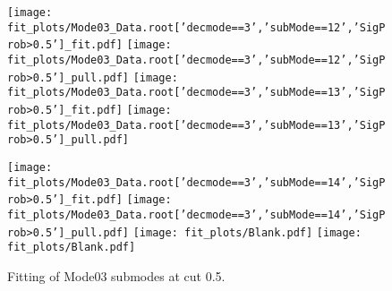 \begin{figure}[p!]
\begin{center}
\texttt{[image: fit\_plots/Mode03\_Data.root['decmode==3','subMode==12','SigProb>0.5']\_fit.pdf]}
\texttt{[image: fit\_plots/Mode03\_Data.root['decmode==3','subMode==12','SigProb>0.5']\_pull.pdf]}
\texttt{[image: fit\_plots/Mode03\_Data.root['decmode==3','subMode==13','SigProb>0.5']\_fit.pdf]}
\texttt{[image: fit\_plots/Mode03\_Data.root['decmode==3','subMode==13','SigProb>0.5']\_pull.pdf]}

\texttt{[image: fit\_plots/Mode03\_Data.root['decmode==3','subMode==14','SigProb>0.5']\_fit.pdf]}
\texttt{[image: fit\_plots/Mode03\_Data.root['decmode==3','subMode==14','SigProb>0.5']\_pull.pdf]}
\texttt{[image: fit\_plots/Blank.pdf]}
\texttt{[image: fit\_plots/Blank.pdf]}

\caption{Fitting of Mode03 submodes at cut 0.5.}
\label{fig:fitMode03}
\end{center}
\end{figure}
